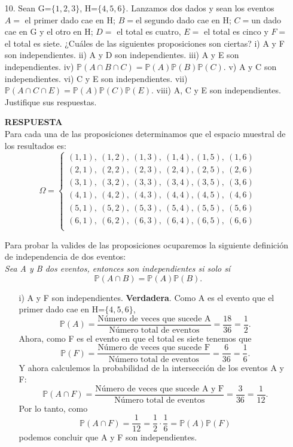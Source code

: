 \documentclass[11pt,letterpaper]{article}
\newcommand{\mP}{\mathbb{P}}
\newcommand{\res}{\textbf{RESPUESTA}\\}
\begin{document}
\begin{itemize}
\item[10.] Sean G=$\{1, 2, 3\}$, H=$\{4, 5, 6\}$. Lanzamos dos dados y sean los eventos $A=$ el primer dado cae en H; $B=$el segundo dado cae en H; $C=$un dado cae en G y el otro en H; $D=$ el total es cuatro, $E=$ el total es cinco y $F=$ el total es siete. ¿Cuáles de las siguientes proposiciones son ciertas? i) A y F son independientes. ii) A y D son independientes. iii) A
y E son independientes. iv) $\mP(A \cap B \cap C) = \mP (A)\mP (B)\mP (C)$. v) A y C son independientes.
vi) C y E son independientes. vii) $\mP (A \cap C \cap E) = \mP (A)\mP (C)\mP (E)$. viii) A, C y E son
independientes. Justifique sus respuestas.

\res
Para cada una de las proposiciones determinamos que el espacio muestral de los resultados es:
\begin{equation*}
\Omega=\left\{ \begin{array}{c}
 (1,1),\ (1,2), \ (1,3),\ (1,4), (1,5),\ (1,6)\\
 (2,1),\ (2,2), \ (2,3),\ (2,4), (2,5),\ (2,6)\\
 (3,1),\ (3,2), \ (3,3),\ (3,4), (3,5),\ (3,6)\\
 (4,1),\ (4,2), \ (4,3),\ (4,4), (4,5),\ (4,6)\\
 (5,1),\ (5,2), \ (5,3),\ (5,4), (5,5),\ (5,6)\\
 (6,1),\ (6,2), \ (6,3),\ (6,4), (6,5),\ (6,6)\\
\end{array}\right.
\end{equation*}

Para probar la valides de las proposiciones ocuparemos la siguiente definición de independencia de dos eventos: \\

\textit{Sea A y B dos eventos, entonces son independientes si solo sí}
$$\mP(A\cap B)=\mP(A)\mP(B).$$

\begin{itemize}
\item[i)] A y F son independientes. \textbf{Verdadera}. Como A es el evento que el primer dado cae en H=$\{4, 5, 6\}$, 
$$\mP(A)=\frac{\text{Número de veces que sucede A}}{\text{Número total de eventos}}= \frac{18}{36}=\frac{1}{2}.$$
Ahora, como F es el evento en que el total es siete tenemos que
$$\mP(F)=\frac{\text{Número de veces que sucede F}}{\text{Número total de eventos}}=\frac{6}{36}=\frac{1}{6}.$$
Y ahora calculemos la probabilidad de la intersección de los eventos A y F:
$$\mP(A\cap F)= \frac{\text{Número de veces que sucede A y F}}{\text{Número total de eventos}}=\frac{3}{36}=\frac{1}{12}.$$
Por lo tanto, como
$$\mP(A\cap F)= \frac{1}{12}=\frac{1}{2}\cdot \frac{1}{6}=\mP(A)\mP(F)$$
podemos concluir que A y F son independientes.


\end{itemize}
\end{itemize}
\end{document}
